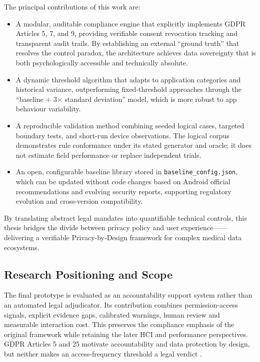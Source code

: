 The principal contributions of this work are:

\begin{itemize}
\item A modular, auditable compliance engine that explicitly implements GDPR Articles 5, 7, and 9, providing verifiable consent revocation tracking and transparent audit trails. By establishing an external ``ground truth'' that resolves the control paradox, the architecture achieves data sovereignty that is both psychologically accessible and technically absolute.
\item A dynamic threshold algorithm that adapts to application categories and historical variance, outperforming fixed-threshold approaches through the ``baseline + 3× standard deviation'' model, which is more robust to app behaviour variability.
\item A reproducible validation method combining seeded logical cases, targeted boundary tests, and short-run device observations. The logical corpus demonstrates rule conformance under its stated generator and oracle; it does not estimate field performance or replace independent trials.
\item An open, configurable baseline library stored in \texttt{baseline\_config.json}, which can be updated without code changes based on Android official recommendations and evolving security reports, supporting regulatory evolution and cross-version compatibility.
\end{itemize}

By translating abstract legal mandates into quantifiable technical controls, this thesis bridges the divide between privacy policy and user experience——delivering a verifiable Privacy-by-Design framework for complex medical data ecosystems.

\subsection{Research Positioning and Scope}

The final prototype is evaluated as an accountability support system rather than an automated legal adjudicator. Its contribution combines permission-access signals, explicit evidence gaps, calibrated warnings, human review and measurable interaction cost. This preserves the compliance emphasis of the original framework while retaining the later HCI and performance perspectives. GDPR Articles 5 and 25 motivate accountability and data protection by design, but neither makes an access-frequency threshold a legal verdict \cite{eurlex2016,edpb2019}.

